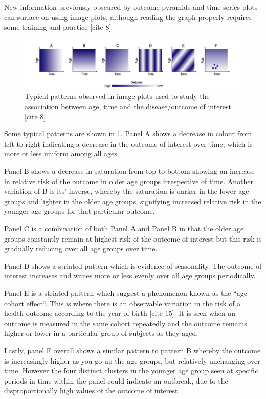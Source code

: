 New information previously obscured by outcome pyramids and time series plots can surface on using image plots, although reading the graph properly requires some training and practice [cite 8]

\begin{figure}[!ht] 
\centering
\includegraphics[scale=0.4]{./Chapter5/images/imageplots}
\caption{Typical patterns observed in image plots used to study the association between age, time and the disease/outcome of interest [cite 8]}
\label{fig1}
\end{figure}

Some typical patterns are shown in \ref{fig1}. Panel A shows a decrease in colour from left to right indicating a decrease in the outcome of interest over time, which is more or less uniform among all ages. 

Panel B shows a decrease in saturation from top to bottom showing an increase in relative risk of the outcome in older age groups irrespective of time. Another variation of B is its’ inverse, whereby the saturation is darker in the lower age groups and lighter in the older age groups, signifying increased relative risk in the younger age groups for that particular outcome. 

Panel C is a combination of both Panel A and Panel B in that the older age groups constantly remain at highest risk of the outcome of interest but this risk is gradually reducing over all age groups over time.

Panel D shows a striated pattern which is evidence of seasonality. The outcome of interest increases and wanes more or less evenly over all age groups periodically.

Panel E is a striated pattern which suggest a phenomenon known as the “age-cohort effect“. This is where there is an observable variation in the risk of a health outcome according to the year of birth [cite 15]. It is seen when an outcome is measured in the same cohort repeatedly and the outcome remains higher or lower in a particular group of subjects as they aged.

Lastly, panel F overall shows a similar pattern to pattern B whereby the outcome is increasingly higher as you go up the age groups, but relatively unchanging over time. However the four distinct clusters in the younger age group seen at specific periods in time within the panel could indicate an outbreak, due to the disproportionally high values of the outcome of interest.

